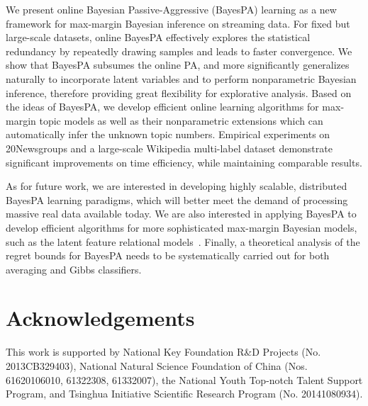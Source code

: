 \documentclass[twoside,11pt]{article}
\begin{document}
We present online Bayesian Passive-Aggressive (BayesPA) learning as a new framework for max-margin Bayesian inference on streaming data. For fixed but large-scale datasets, online BayesPA effectively explores the statistical redundancy by repeatedly drawing samples and leads to faster convergence. We show that BayesPA subsumes the online PA, and more significantly generalizes naturally to incorporate latent variables and to perform nonparametric Bayesian inference, therefore providing great flexibility for explorative analysis.
Based on the ideas of BayesPA, we develop efficient online learning algorithms for max-margin topic models as well as their nonparametric extensions which can automatically infer the unknown topic numbers. Empirical experiments on 20Newsgroups and a large-scale Wikipedia multi-label dataset demonstrate significant improvements on time efficiency, while maintaining comparable results.

As for future work, we are interested in developing highly scalable, distributed \citep{broderick2013streaming} BayesPA learning paradigms, which will better meet the demand of processing massive real data available today. We are also interested in applying BayesPA to develop efficient algorithms for more sophisticated max-margin Bayesian models, such as the latent feature relational models~\citep{zhu2012maxlink}. Finally, a theoretical analysis of the regret bounds for BayesPA needs to be systematically carried out for both averaging and Gibbs classifiers.


\section*{Acknowledgements}

This work is supported by National Key Foundation R\&D Projects (No. 2013CB329403), 
National Natural Science Foundation of China (Nos. 61620106010, 61322308,
61332007), the National Youth Top-notch Talent Support Program, and Tsinghua Initiative Scientific Research Program (No.
20141080934).
\end{document}
